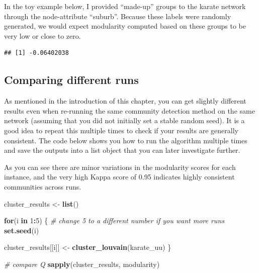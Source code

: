 \documentclass[
]{book}
\newenvironment{Shaded}{\begin{snugshade}}{\end{snugshade}}
\newcommand{\AttributeTok}[1]{\textcolor[rgb]{0.13,0.29,0.53}{#1}}
\newcommand{\CommentTok}[1]{\textcolor[rgb]{0.56,0.35,0.01}{\textit{#1}}}
\newcommand{\ConstantTok}[1]{\textcolor[rgb]{0.56,0.35,0.01}{#1}}
\newcommand{\ControlFlowTok}[1]{\textcolor[rgb]{0.13,0.29,0.53}{\textbf{#1}}}
\newcommand{\DecValTok}[1]{\textcolor[rgb]{0.00,0.00,0.81}{#1}}
\newcommand{\FunctionTok}[1]{\textcolor[rgb]{0.13,0.29,0.53}{\textbf{#1}}}
\newcommand{\NormalTok}[1]{#1}
\newcommand{\OtherTok}[1]{\textcolor[rgb]{0.56,0.35,0.01}{#1}}
\newcommand{\SpecialCharTok}[1]{\textcolor[rgb]{0.81,0.36,0.00}{\textbf{#1}}}
\begin{document}
In the toy example below, I provided ``made-up'' groups to the karate network through the node-attribute ``suburb''. Because these labels were randomly generated, we would expect modularity computed based on these groups to be very low or close to zero.

\begin{Shaded}
\end{Shaded}

\begin{verbatim}
## [1] -0.06402038
\end{verbatim}

\subsection{Comparing different runs}\label{comparing-different-runs}

As mentioned in the introduction of this chapter, you can get slightly different results even when re-running the same community detection method on the same network (assuming that you did not initially set a stable random seed). It is a good idea to repeat this multiple times to check if your results are generally consistent. The code below shows you how to run the algorithm multiple times and save the outputs into a list object that you can later investigate further.

As you can see there are minor variations in the modularity scores for each instance, and the very high Kappa score of 0.95 indicates highly consistent communities across runs.

\begin{Shaded}
\begin{Highlighting}[]
\NormalTok{cluster\_results }\OtherTok{\textless{}{-}} \FunctionTok{list}\NormalTok{()}

\ControlFlowTok{for}\NormalTok{(i }\ControlFlowTok{in} \DecValTok{1}\SpecialCharTok{:}\DecValTok{5}\NormalTok{) \{ }\CommentTok{\# change 5 to a different number if you want more runs }
  \FunctionTok{set.seed}\NormalTok{(i)}
  
\NormalTok{  cluster\_results[[i]] }\OtherTok{\textless{}{-}} \FunctionTok{cluster\_louvain}\NormalTok{(karate\_uu)}
\NormalTok{\}}

\CommentTok{\# compare Q}
\FunctionTok{sapply}\NormalTok{(cluster\_results, modularity)}
\end{Highlighting}
\end{Shaded}
\end{document}
